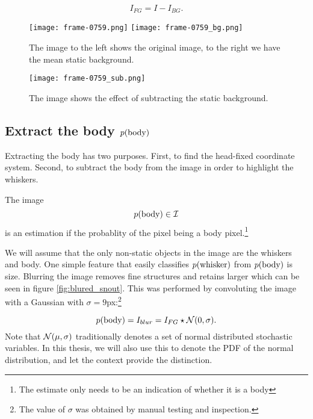 \begin{equation}
  I_{FG} = I - I_{BG}.
\end{equation}

\begin{figure}
\begin{center}
    \texttt{[image: frame-0759.png]}
    \texttt{[image: frame-0759\_bg.png]}
\end{center}
\caption{The image to the left shows the original image, to the right we have the mean static background.}
\label{fig:orignal_bg}
\end{figure}
\begin{figure}
\begin{center}
    \texttt{[image: frame-0759\_sub.png]}
\end{center}
\caption{The image shows the effect of subtracting the static background.}
\label{fig:subtract}
\end{figure}

\subsection{Extract the body $p{(\text{body})}$}
\label{sec:findbody}
Extracting the body has two purposes. First, to find the head-fixed
coordinate system. Second, to subtract the body from the image in
order to highlight the whiskers.

\begin{definition}
  The image
  \begin{equation}
    p{(\text{body})}\in \mathcal{I}
  \end{equation} is an estimation if the probablity of the pixel
  being a body pixel.\footnote{The estimate only needs to
    be an indication of whether it is a body}
\end{definition}

We will assume that the only non-static objects in the image are the
whiskers and body. One simple feature that easily classifies
$p{(\text{whisker})}$ from $p{(\text{body})}$ is size. Blurring
the image removes fine structures and retains larger which can be seen in figure \ref{fig:blured_snout}.  This was
performed by convoluting the image with a Gaussian with
${\sigma=9}$px:\footnote{The value of $\sigma$ was obtained by manual
  testing and inspection.}

\begin{equation}
  p{(\text{body})} = I_{blur} = I_{FG} \star \mathcal{N}{\left(0, \sigma\right)}.
\end{equation}
Note that $\mathcal{N}{\left(\mu, \sigma\right)}$ traditionally denotes a set of normal
distributed stochastic variables. In this thesis, we will also use
this to denote the PDF of the normal distribution, and let the context
provide the distinction.


